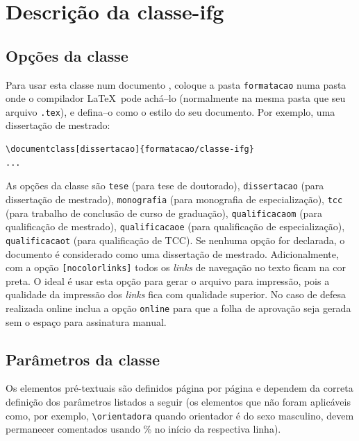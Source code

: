\chapter{Descrição da \textsf{classe-ifg}}
\label{cap:descr}

\section{Opções da classe}
\label{sec:opcoes}
Para usar esta classe num documento \LaTeXe, coloque a pasta \verb|formatacao| numa pasta onde o compilador \LaTeX\ pode achá--lo (normalmente na mesma pasta que seu arquivo \verb|.tex|), e defina--o como o estilo do seu documento. Por exemplo, uma dissertação de mestrado:
\begin{verbatim}
\documentclass[dissertacao]{formatacao/classe-ifg}
...

\end{verbatim}

As opções da classe são \verb|tese| (para tese de doutorado), \verb|dissertacao| (para dissertação de mestrado), \verb|monografia| (para monografia de especialização), \verb|tcc| (para trabalho de conclusão de curso de graduação), \verb|qualificacaom| (para qualificação de mestrado), \verb|qualificacaoe| (para qualificação de especialização), \verb|qualificacaot| (para qualificação de TCC). Se nenhuma opção for declarada, o documento é considerado como uma dissertação de mestrado. Adicionalmente, com a opção \verb|[nocolorlinks]| todos os {\em links} de navegação no texto ficam na cor preta. O ideal é usar esta opção para gerar o arquivo para impressão, pois a qualidade da impressão dos {\em links} fica com qualidade superior. No caso de defesa realizada online inclua a opção \verb|online| para que a folha de aprovação seja gerada sem o espaço para assinatura manual.


\section{Parâmetros da classe}
\label{sec:param}
Os elementos pré-textuais são definidos página por página e dependem da correta definição dos parâmetros listados a seguir (os elementos que não foram aplicáveis como, por exemplo, \verb|\orientadora| quando orientador é do sexo masculino, devem permanecer comentados usando \% no início da respectiva linha).


